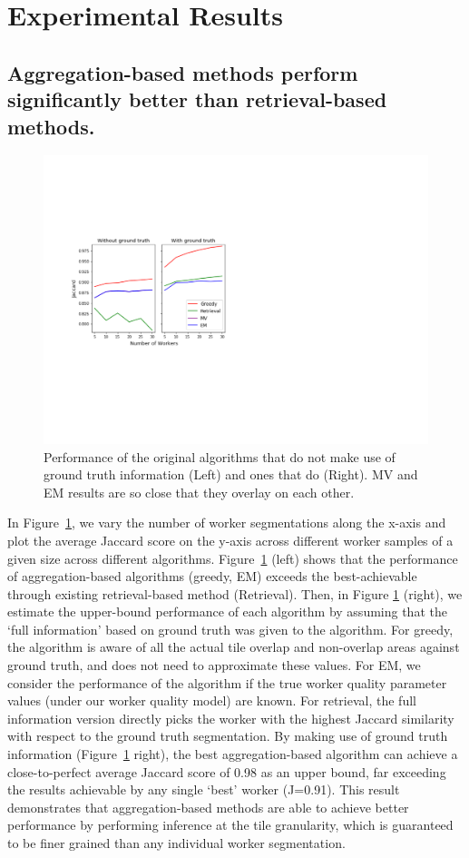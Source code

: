 \section{Experimental Results\label{sec:experiment}}
\subsection*{Aggregation-based methods perform significantly better than retrieval-based methods.}
\begin{figure}[h!]
   \centering
   \includegraphics[trim={0 1pt 4pt 0},clip,width=0.8\linewidth]{plots/Retrieval_vs_Aggregation.pdf}
   \caption{Performance of the original algorithms that do not make use of ground truth information (Left) and ones that do (Right). MV and EM results are so close that they overlay on each other.} 
   \label{retrieval_vs_aggregation}   
\end{figure} 
\npar In Figure~\ref{retrieval_vs_aggregation}, we vary the number of worker segmentations along the x-axis and plot the average Jaccard score on the y-axis across different worker samples of a given size across different algorithms. Figure~\ref{retrieval_vs_aggregation} (left) shows that the performance of aggregation-based algorithms (greedy, EM) exceeds the best-achievable through existing retrieval-based method (Retrieval). Then, in Figure \ref{retrieval_vs_aggregation} (right), we estimate the upper-bound performance of each algorithm by assuming that the `full information' based on ground truth was given to the algorithm. For greedy, the algorithm is aware of all the actual tile overlap and non-overlap areas against ground truth, and does not need to approximate these values. For EM, we consider the performance of the algorithm if the true worker quality parameter values (under our worker quality model) are known. For retrieval, the full information version directly picks the worker with the highest Jaccard similarity with respect to the ground truth segmentation. By making use of ground truth information (Figure~\ref{retrieval_vs_aggregation} right), the best aggregation-based algorithm can achieve a close-to-perfect average Jaccard score of 0.98 as an upper bound, far exceeding the results achievable by any single `best' worker (J=0.91). This result demonstrates that aggregation-based methods are able to achieve better performance by performing inference at the tile granularity, which is guaranteed to be finer grained than any individual worker segmentation. 

